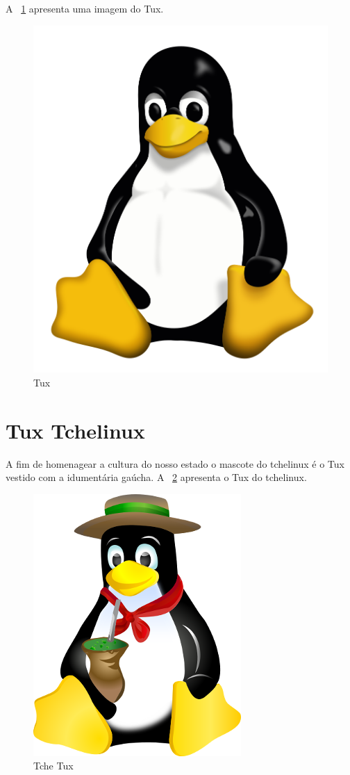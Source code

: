 \documentclass[conference]{IEEEtran}
\begin{document}
	A \figurename~\ref{tux} apresenta uma imagem do Tux.
	
	\begin{figure}[!hbt]
		\centering
		\includegraphics[scale=0.1]{tuxOriginal.png}
		\caption{Tux}
		\label{tux}
	\end{figure}
	
	
	\section{Tux Tchelinux}
	
		A fim de homenagear a cultura do nosso estado o mascote do tchelinux é o Tux vestido com a idumentária gaúcha. A \figurename~\ref{tcheTux} apresenta o Tux do tchelinux.
		
		\begin{figure}[!htb]
			\centering
			\includegraphics[scale=0.5]{figura.png}
			\caption{Tche Tux}
			\label{tcheTux}
		\end{figure}
		
\end{document}

